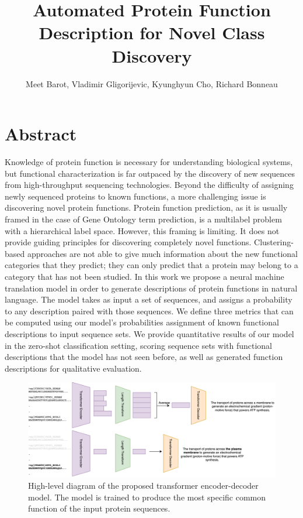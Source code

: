 \documentclass{specification}
\title{Automated Protein Function Description for Novel Class Discovery}
\author{Meet Barot, Vladimir Gligorijevic, Kyunghyun Cho, Richard Bonneau}
\begin{document}
\maketitle

\section{Abstract}
Knowledge of protein function is necessary for understanding biological systems, but functional characterization is far outpaced by the discovery of new sequences from high-throughput sequencing technologies.
Beyond the difficulty of assigning newly sequenced proteins to known functions, a more challenging issue is discovering novel protein functions.
Protein function prediction, as it is usually framed in the case of Gene Ontology term prediction, is a multilabel problem with a hierarchical label space.
However, this framing is limiting. It does not provide guiding principles for discovering completely novel functions.
Clustering-based approaches are not able to give much information about the new functional categories that they predict; they can only predict that a protein may belong to a category that has not been studied.
In this work we propose a neural machine translation model in order to generate descriptions of protein functions in natural language.
The model takes as input a set of sequences, and assigns a probability to any description paired with those sequences.
We define three metrics that can be computed using our model's probabilities assignment of known functional descriptions to input sequence sets.
We provide quantitative results of our model in the zero-shot classification setting, scoring sequence sets with functional descriptions that the model has not seen before, as well as generated function descriptions for qualitative evaluation.

\begin{figure}
    \centering
    \includegraphics[width=0.9\linewidth]{prot2go.png}
    \caption{High-level diagram of the proposed transformer encoder-decoder model.
The model is trained to produce the most specific common function of the input protein sequences.}
    \label{overview}
\end{figure}
\end{document}
